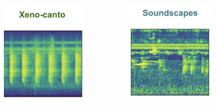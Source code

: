 \begin{frame}{}
    \begin{columns}
        \begin{column}{0.5\textwidth}
            \centering
            \includegraphics[height=0.7\textheight,width=0.7\textwidth,keepaspectratio]{xeno.png}
        \end{column}
        \begin{column}{0.5\textwidth}
            \centering
            \includegraphics[height=0.7\textheight,width=0.7\textwidth,keepaspectratio]{soundscape.png}
        \end{column}
    \end{columns}
\end{frame}



